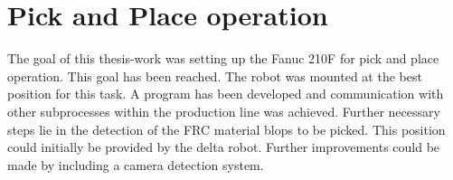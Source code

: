 \section{Pick and Place operation}
The goal of this thesis-work was setting up the Fanuc 210F for pick and place operation. This goal has been reached. The robot was mounted at the best position for this task. A program has been developed and communication with other subprocesses within the production line was achieved. 
Further necessary steps lie in the detection of the \ac{FRC} material blops to be picked. This position could initially be provided by the delta robot. Further improvements could be made by including a camera detection system.



